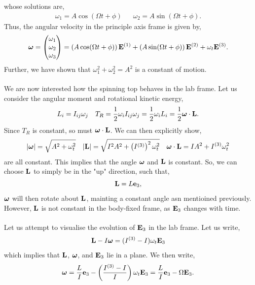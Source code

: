 \documentclass{book}
\begin{document}
whose solutions are,
\begin{align}
    \omega_1 = A\cos{(\Omega t + \phi)} && \omega_2 = A\sin{(\Omega t + \phi)}.
\end{align}
Thus, the angular velocity in the principle axis frame is given by,
\begin{equation}
    \vb*{\omega} = \begin{pmatrix}
        \omega_1 \\ \omega_2 \\ \omega_3
    \end{pmatrix} = \left(A\cos(\Omega t + \phi)\right)\vb{E}^{(1)} + \left(A\sin(\Omega t + \phi)\right)\vb{E}^{(2)} + \omega_t\vb{E}^{(3)}.
\end{equation}
Further, we have shown that $\omega_1^2 + \omega_2^2 = A^2$ is a constant of motion.
\\\\
We are now interested how the spinning top behaves in the lab frame.  Let us consider the angular moment and rotational kinetic energy,
\begin{align}
	L_i = I_{ij}\omega_j && T_R = \frac{1}{2}\omega_i I_{ij}\omega_j = \frac{1}{2} \omega_iL_i = \frac{1}{2}\vb*{\omega}\cdot\vb{L}.
\end{align}
Since $T_R$ is constant, so must $\vb*{\omega}\cdot\vb{L}$. We can then explicitly show,
\begin{align}
	|\vb*{\omega}| = \sqrt{A^2 + \omega_t^2} && |\vb{L}|=\sqrt{I^2A^2 + \left(I^{(3)}\right)^2 \omega_t^2} && \vb*{\omega}\cdot\vb{L}=IA^2 + I^{(3)} \omega_t^2
\end{align}
are all constant. This implies that the angle $\vb*{\omega}$ and $\vb{L}$ is constant. So, we can choose $\vb{L}$ to simply be in the "up" direction, such that,
\begin{equation}
	\vb{L} = L\vb{e}_3,
\end{equation}
$\vb*{\omega}$ will  then rotate about $\vb{L}$, mainting a constant angle asn mentioined previously. However, $\vb{L}$ is not constant in the body-fixed frame, as $\vb{E}_3$ changes with time.
\\\\
Let us attempt to visualise the evolution of $\vb{E}_3$ in the lab frame. Let us write,
\begin{equation}
	\vb{L} - I\vb*{\omega} = (I^{(3)} - I)\omega_t\vb{E}_3
\end{equation}
which implies that $\vb{L}$, $\vb*{\omega}$, and $\vb{E}_3$ lie in a plane. We then write,
\begin{equation}
	\vb*{\omega} = \frac{L}{I}\vb{e}_3 - \left(\frac{I^{(3)} - I}{I}\right)\omega_t \vb{E}_3 = \frac{L}{I}\vb{e}_3 - \Omega\vb{E}_3. \label{eq:angvec}
\end{equation}
\end{document}
